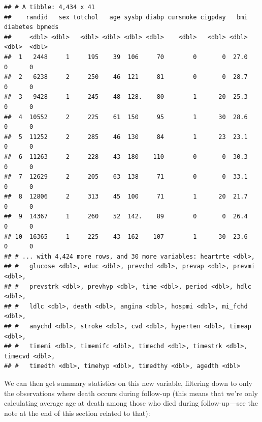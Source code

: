 \documentclass[
]{book}
\newenvironment{Shaded}{\begin{snugshade}}{\end{snugshade}}
\newcommand{\DataTypeTok}[1]{\textcolor[rgb]{0.13,0.29,0.53}{#1}}
\newcommand{\DecValTok}[1]{\textcolor[rgb]{0.00,0.00,0.81}{#1}}
\newcommand{\KeywordTok}[1]{\textcolor[rgb]{0.13,0.29,0.53}{\textbf{#1}}}
\newcommand{\NormalTok}[1]{#1}
\newcommand{\OperatorTok}[1]{\textcolor[rgb]{0.81,0.36,0.00}{\textbf{#1}}}
\newcommand{\StringTok}[1]{\textcolor[rgb]{0.31,0.60,0.02}{#1}}
\begin{document}
\begin{verbatim}
## # A tibble: 4,434 x 41
##    randid   sex totchol   age sysbp diabp cursmoke cigpday   bmi diabetes bpmeds
##     <dbl> <dbl>   <dbl> <dbl> <dbl> <dbl>    <dbl>   <dbl> <dbl>    <dbl>  <dbl>
##  1   2448     1     195    39  106     70        0       0  27.0        0      0
##  2   6238     2     250    46  121     81        0       0  28.7        0      0
##  3   9428     1     245    48  128.    80        1      20  25.3        0      0
##  4  10552     2     225    61  150     95        1      30  28.6        0      0
##  5  11252     2     285    46  130     84        1      23  23.1        0      0
##  6  11263     2     228    43  180    110        0       0  30.3        0      0
##  7  12629     2     205    63  138     71        0       0  33.1        0      0
##  8  12806     2     313    45  100     71        1      20  21.7        0      0
##  9  14367     1     260    52  142.    89        0       0  26.4        0      0
## 10  16365     1     225    43  162    107        1      30  23.6        0      0
## # ... with 4,424 more rows, and 30 more variables: heartrte <dbl>,
## #   glucose <dbl>, educ <dbl>, prevchd <dbl>, prevap <dbl>, prevmi <dbl>,
## #   prevstrk <dbl>, prevhyp <dbl>, time <dbl>, period <dbl>, hdlc <dbl>,
## #   ldlc <dbl>, death <dbl>, angina <dbl>, hospmi <dbl>, mi_fchd <dbl>,
## #   anychd <dbl>, stroke <dbl>, cvd <dbl>, hyperten <dbl>, timeap <dbl>,
## #   timemi <dbl>, timemifc <dbl>, timechd <dbl>, timestrk <dbl>, timecvd <dbl>,
## #   timedth <dbl>, timehyp <dbl>, timedthy <dbl>, agedth <dbl>
\end{verbatim}

We can then get summary statistics on this new variable, filtering down to only the observations where death occurs during follow-up (this means that we're only calculating average age at death among those who died during follow-up---see the note at the end of this section related to that):

\begin{Shaded}
\end{Shaded}
\end{document}
